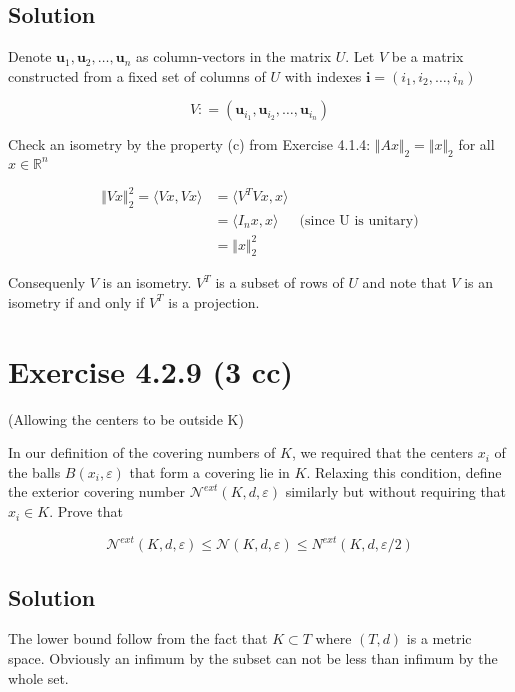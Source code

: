 \documentclass{article}
\begin{document}
\subsection{Solution}

Denote $\mathbf u_1, \mathbf u_2, \dots , \mathbf u_n$ as column-vectors in the matrix $U$. Let $V$ be a matrix constructed from a fixed set of columns of $U$ with indexes $\mathbf i = (i_1, i_2, \dots, i_n)$

$$V: = (\mathbf u_{i_1}, \mathbf u_{i_2}, \dots, \mathbf u_{i_n})$$

Check an isometry by the property (c) from Exercise 4.1.4: $\Vert Ax \Vert_2 = \Vert x \Vert_2$ for all $x \in \mathbb R^n$

\begin{equation*}
    \begin{aligned}
        \Vert Vx \Vert_2^2 = \langle Vx, Vx \rangle & = \langle V^TVx, x \rangle \\
        & = \langle I_nx, x \rangle & \text{(since U is unitary)} \\
        & = \Vert x \Vert_2^2
    \end{aligned}    
\end{equation*}

Consequenly $V$ is an isometry. $V^T$ is a subset of rows of $U$ and note that $V$ is an isometry if and only if $V^T$ is a projection.

\section{Exercise 4.2.9 (3 cc)}

(Allowing the centers to be outside K)

In our definition of the covering numbers of $K$, we required that the centers $x_i$ of the balls $B(x_i, \varepsilon)$ that form a covering lie in $K$. Relaxing this condition, define the exterior covering number $\mathcal N^{ext}(K, d, \varepsilon)$ similarly but without requiring that $x_i \in K$. Prove that

$$\mathcal N^{ext}(K, d, \varepsilon) \leq \mathcal N (K, d, \varepsilon) \leq N^{ext}(K, d, \varepsilon/2)$$

\subsection{Solution}

The lower bound follow from the fact that $K \subset T$ where $(T, d)$ is a metric space. Obviously an infimum by the subset can not be less than infimum by the whole set. 
\end{document}
